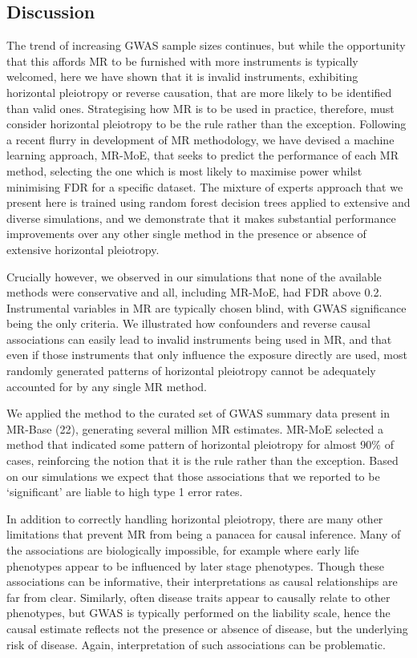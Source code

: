 \documentclass[]{article}
\begin{document}
\subsection{Discussion}\label{discussion}

The trend of increasing GWAS sample sizes continues, but while the
opportunity that this affords MR to be furnished with more instruments
is typically welcomed, here we have shown that it is invalid
instruments, exhibiting horizontal pleiotropy or reverse causation, that
are more likely to be identified than valid ones. Strategising how MR is
to be used in practice, therefore, must consider horizontal pleiotropy
to be the rule rather than the exception. Following a recent flurry in
development of MR methodology, we have devised a machine learning
approach, MR-MoE, that seeks to predict the performance of each MR
method, selecting the one which is most likely to maximise power whilst
minimising FDR for a specific dataset. The mixture of experts approach
that we present here is trained using random forest decision trees
applied to extensive and diverse simulations, and we demonstrate that it
makes substantial performance improvements over any other single method
in the presence or absence of extensive horizontal pleiotropy.

Crucially however, we observed in our simulations that none of the
available methods were conservative and all, including MR-MoE, had FDR
above 0.2. Instrumental variables in MR are typically chosen blind, with
GWAS significance being the only criteria. We illustrated how
confounders and reverse causal associations can easily lead to invalid
instruments being used in MR, and that even if those instruments that
only influence the exposure directly are used, most randomly generated
patterns of horizontal pleiotropy cannot be adequately accounted for by
any single MR method.

We applied the method to the curated set of GWAS summary data present in
MR-Base (22), generating several million MR estimates. MR-MoE selected a
method that indicated some pattern of horizontal pleiotropy for almost
90\% of cases, reinforcing the notion that it is the rule rather than
the exception. Based on our simulations we expect that those
associations that we reported to be `significant' are liable to high
type 1 error rates.

In addition to correctly handling horizontal pleiotropy, there are many
other limitations that prevent MR from being a panacea for causal
inference. Many of the associations are biologically impossible, for
example where early life phenotypes appear to be influenced by later
stage phenotypes. Though these associations can be informative, their
interpretations as causal relationships are far from clear. Similarly,
often disease traits appear to causally relate to other phenotypes, but
GWAS is typically performed on the liability scale, hence the causal
estimate reflects not the presence or absence of disease, but the
underlying risk of disease. Again, interpretation of such associations
can be problematic.
\end{document}
